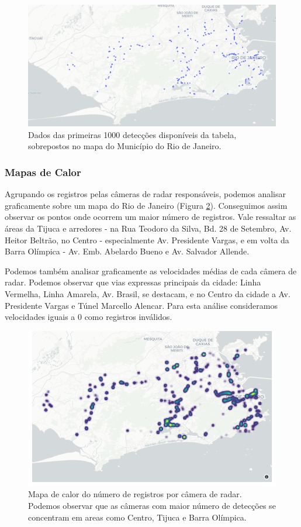 \documentclass{article}
\begin{document}
\begin{figure}
    \centering
    \includegraphics[width=1.0\linewidth]{disp1000Map2.png}
    \caption{Dados das primeiras 1000 detecções disponíveis da tabela, sobrepostos no mapa do Município do Rio de Janeiro.}
    \label{fig:disp1000Map}
\end{figure}

\subsubsection{Mapas de Calor}

Agrupando os registros pelas câmeras de radar responsáveis, podemos analisar graficamente sobre um mapa do Rio de Janeiro (Figura \ref{fig:heatmapNumber}). Conseguimos assim observar os pontos onde ocorrem um maior número de registros. Vale ressaltar as áreas da Tijuca e arredores - na Rua Teodoro da Silva, Bd. 28 de Setembro, Av. Heitor Beltrão, no Centro - especialmente Av. Presidente Vargas, e em volta da Barra Olímpica - Av. Emb. Abelardo Bueno e Av. Salvador Allende.

Podemos também analisar graficamente as velocidades médias de cada câmera de radar. Podemos observar que vias expressas principais da cidade: Linha Vermelha, Linha Amarela, Av. Brasil, se destacam, e no Centro da cidade a Av. Presidente Vargas e Túnel Marcello Alencar. Para esta análise consideramos velocidades iguais a 0 como registros inválidos. 


\begin{figure}
    \centering
    \includegraphics[width=1\linewidth]{heatmapNumberFinal.png}
    \caption{Mapa de calor do número de registros por câmera de radar. Podemos observar que as câmeras com maior número de detecções se concentram em areas como Centro, Tijuca e Barra Olímpica.}
    \label{fig:heatmapNumber}
\end{figure}
\end{document}
